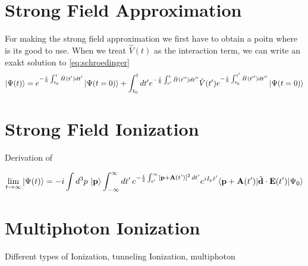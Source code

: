 \newpage
\section{Strong Field Approximation}

For making the strong field approximation we first have to obtain a poitn where is its good to use. 
When we treat $\hat{V}(t)$ as the interaction term, we can write an exakt solution to \eqref{eq:schroedinger}
\begin{equation}
    \ket{\Psi(t)} = e^{-\frac{i}{\hbar} \int_{t_0}^{t} \hat{H}(t') dt'} \ket{\Psi(t=0)} + \int_{t_0}^{t} dt' e^{-\frac{i}{\hbar} \int_{t'}^{t} \hat{H}(t'') dt''} \hat{V}(t') e^{-\frac{i}{\hbar} \int_{t_0}^{t'} \hat{H}(t'') dt''} \ket{\Psi(t=0)}
\end{equation}




\newpage
\section{Strong Field Ionization}

Derivation of 

\begin{equation}
    \lim_{t \to \infty} \ket{\Psi(t)}  = -i \int d^3 p\, \ket{\mathbf{p}} \int_{-\infty}^{\infty} dt'\, e^{-\frac{i}{2}\int_{t'}^{\infty} [\mathbf{p}+\mathbf{A}(t')]^2 \, dt'} e^{i I_\mathrm{p} t'} \langle \mathbf{p} + \mathbf{A}(t') | \hat{\mathbf{d}} \cdot \mathbf{E}(t') | \Psi_0 \rangle
\end{equation}





\newpage
\section{Multiphoton Ionization}

Different types of Ionization, tunneling Ionization, multiphoton